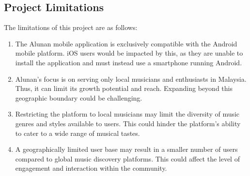 \subsection{Project Limitations}
The limitations of this project are as follows:
\begin{enumerate}[1.]
    \item The Alunan mobile application is exclusively compatible with the Android mobile platform. iOS users would be impacted by this, as they are unable to install the application and must instead use a smartphone running Android. 
    \item Alunan's focus is on serving only local musicians and enthusiasts in Malaysia. Thus, it can limit its growth potential and reach. Expanding beyond this geographic boundary could be challenging.
    \item Restricting the platform to local musicians may limit the diversity of music genres and styles available to users. This could hinder the platform's ability to cater to a wide range of musical tastes.
    \item A geographically limited user base may result in a smaller number of users compared to global music discovery platforms. This could affect the level of engagement and interaction within the community.
\end{enumerate}

